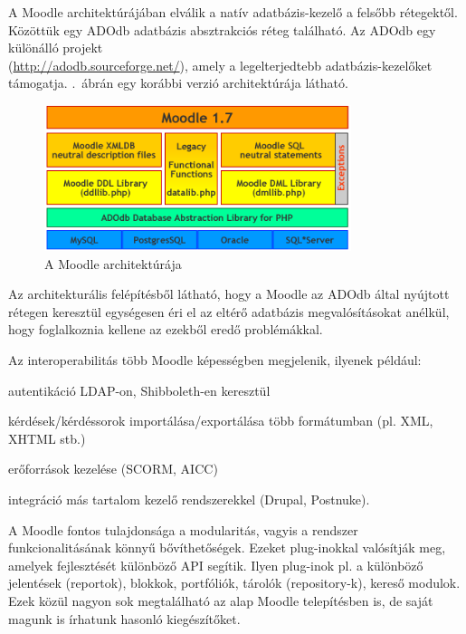 A Moodle architektúrájában elválik a natív adatbázis-kezelő a felsőbb rétegektől. Közöttük egy ADOdb adatbázis absztrakciós réteg található. Az ADOdb egy különálló projekt \\ (\href{http://adodb.sourceforge.net/}{http://adodb.sourceforge.net/}), amely a legelterjedtebb adatbázis-kezelőket támogatja. .~ábrán egy korábbi verzió architektúrája látható.

\begin{figure}[h!]
\centering
\includegraphics[width=0.8\textwidth]{figures/moodlearch.png}
\caption{A Moodle architektúrája \label{fig:moodlearch}}
\end{figure}

Az architekturális felépítésből látható, hogy a Moodle az ADOdb által nyújtott rétegen keresztül egységesen éri el az eltérő adatbázis megvalósításokat anélkül, hogy foglalkoznia kellene az ezekből eredő problémákkal.  

Az interoperabilitás több Moodle képességben megjelenik, ilyenek például:
\begin{sajat_itemize}
\setlength{\itemsep}{0pt}
\item autentikáció LDAP-on, Shibboleth-en keresztül
\item kérdések/kérdéssorok importálása/exportálása több formátumban (pl. XML, XHTML stb.)
\item erőforrások kezelése (SCORM, AICC)
\item integráció más tartalom kezelő rendszerekkel (Drupal, Postnuke).
\end{sajat_itemize}

A Moodle fontos tulajdonsága a modularitás, vagyis a rendszer funkcionalitásának könnyű bővíthetőségek. Ezeket plug-inokkal valósítják meg, amelyek fejlesztését különböző API segítik. Ilyen plug-inok pl. a különböző jelentések (reportok), blokkok, portfóliók, tárolók (repository-k), kereső modulok. Ezek közül nagyon sok megtalálható az alap Moodle telepítésben is, de saját magunk is írhatunk hasonló kiegészítőket.

